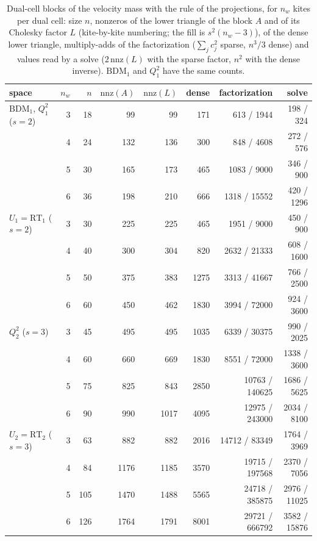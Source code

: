 \documentclass[preprint,12pt]{elsarticle}
\theoremstyle{definition}
\begin{document}
\begin{table}[t]
\centering
\caption{Dual-cell blocks of the velocity mass with the rule of the projections, for $n_w$ kites per dual
cell: size $n$, nonzeros of the lower triangle of the block $A$ and of its Cholesky factor $L$ (kite-by-kite
numbering; the fill is $s^2(n_w-3)$), of the dense lower triangle, multiply-adds of the factorization
($\sum_j c_j^2$ sparse, $n^3/3$ dense) and values read by a solve ($2\,\mathrm{nnz}(L)$ with the sparse factor,
$n^2$ with the dense inverse). $\mathrm{BDM}_1$ and $Q_1^2$ have the same counts.}
\label{tab:blocks}
\footnotesize\setlength{\tabcolsep}{4pt}\begin{tabular}{lrrrrrrr}
\toprule
space & $n_w$ & $n$ & $\mathrm{nnz}(A)$ & $\mathrm{nnz}(L)$ & dense & factorization & solve \\
\midrule
$\mathrm{BDM}_1$, $Q_1^2$ ($s = 2$) & 3 & 18 & 99 & 99 & 171 & 613 / 1944 & 198 / 324 \\
 & 4 & 24 & 132 & 136 & 300 & 848 / 4608 & 272 / 576 \\
 & 5 & 30 & 165 & 173 & 465 & 1083 / 9000 & 346 / 900 \\
 & 6 & 36 & 198 & 210 & 666 & 1318 / 15552 & 420 / 1296 \\
\midrule
$U_1 = \mathrm{RT}_1$ ($s = 2$) & 3 & 30 & 225 & 225 & 465 & 1951 / 9000 & 450 / 900 \\
 & 4 & 40 & 300 & 304 & 820 & 2632 / 21333 & 608 / 1600 \\
 & 5 & 50 & 375 & 383 & 1275 & 3313 / 41667 & 766 / 2500 \\
 & 6 & 60 & 450 & 462 & 1830 & 3994 / 72000 & 924 / 3600 \\
\midrule
$Q_2^2$ ($s = 3$) & 3 & 45 & 495 & 495 & 1035 & 6339 / 30375 & 990 / 2025 \\
 & 4 & 60 & 660 & 669 & 1830 & 8551 / 72000 & 1338 / 3600 \\
 & 5 & 75 & 825 & 843 & 2850 & 10763 / 140625 & 1686 / 5625 \\
 & 6 & 90 & 990 & 1017 & 4095 & 12975 / 243000 & 2034 / 8100 \\
\midrule
$U_2 = \mathrm{RT}_2$ ($s = 3$) & 3 & 63 & 882 & 882 & 2016 & 14712 / 83349 & 1764 / 3969 \\
 & 4 & 84 & 1176 & 1185 & 3570 & 19715 / 197568 & 2370 / 7056 \\
 & 5 & 105 & 1470 & 1488 & 5565 & 24718 / 385875 & 2976 / 11025 \\
 & 6 & 126 & 1764 & 1791 & 8001 & 29721 / 666792 & 3582 / 15876 \\
\bottomrule
\end{tabular}
\end{table}
\end{document}
